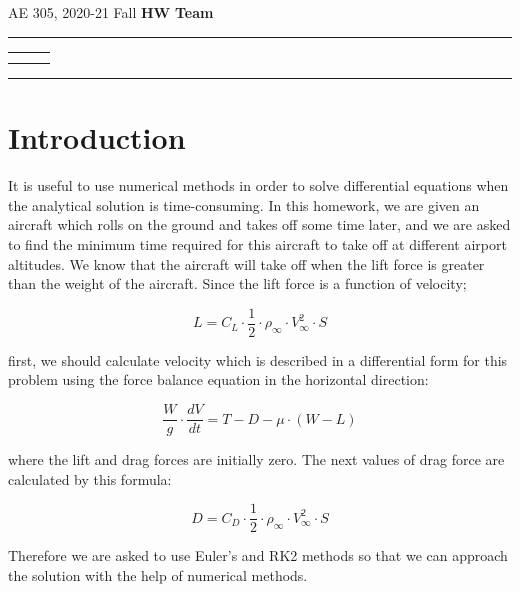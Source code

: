 \documentclass[letterpaper,12pt]{article}
\begin{document}
\begin{center}
AE 305, 2020-21 Fall \hfill \textbf{HW \HWno} \hfill \textbf{Team \TeamNo} \\
\noindent\rule{\textwidth}{0.4pt}
\begin{tabular}{p{} | p{} | p{} }
	\AuthorOneName&\AuthorTwoName&\AuthorThreeName\\
	\textit{\AuthorOneID}&\textit{\AuthorTwoID}&\textit{\AuthorThreeID}
\end{tabular}
\noindent\rule{\textwidth}{0.4pt}
\end{center}


\section{Introduction}

It is useful to use numerical methods in order to solve differential equations when
the analytical solution is time-consuming. In this homework, we are given an aircraft
which rolls on the ground and takes off some time later, and we are asked to find
the minimum time required for this aircraft to take off at different airport altitudes.
We know that the aircraft will take off when the lift force is greater than the weight of
the aircraft. Since the lift force is a function of velocity;

\begin{equation}
        L = C_L \cdot \frac{1}{2} \cdot \rho_{\infty} \cdot V_{\infty}^{2} \cdot S
\end{equation}

first, we should calculate velocity which is described in a differential form for
this problem using the force balance equation in the horizontal direction:

\begin{equation}
        \frac{W}{g} \cdot \frac{dV}{dt} = T - D - \mu \cdot (W - L)
\end{equation}

where the lift and drag forces are initially zero. The next values of drag force are calculated
by this formula:

\begin{equation}
        D = C_D \cdot \frac{1}{2} \cdot \rho_{\infty} \cdot V_{\infty}^{2} \cdot S
\end{equation}

Therefore we are asked to use Euler's and RK2 methods so that we can approach the
solution with the help of numerical methods.
\end{document}
